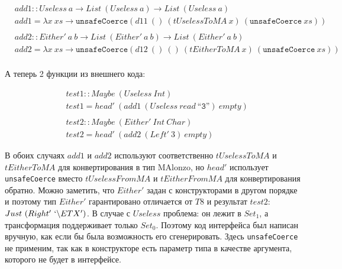\begin{align*}
\\
&add1 :: Useless\ a \rightarrow List\ (Useless\ a) \rightarrow List\ (Useless\ a)\\
&add1 = \lambda x\ xs \rightarrow \texttt{unsafeCoerce} (d11\ () \ (
   tUselessToMA\ x)\ (\texttt{unsafeCoerce}\ xs))\\
\\
&add2 :: Either'\ a\ b \rightarrow List\ (Either'\ a\ b) \rightarrow
   List\ (Either'\ a\ b)\\
&add2 = \lambda x\ xs \rightarrow \texttt{unsafeCoerce} (d12\ ()\ () \ (
   tEitherToMA\ x)\ (\texttt{unsafeCoerce}\ xs))\\
\end{align*}

А теперь 2 функции из внешнего кода:

\begin{align*}
&test1 :: Maybe\ (Useless\ Int)\\
&test1 = head'\ (add1\ (Useless\ read\ \texttt{``3''})\ empty)\\
\\
&test2 :: Maybe\ (Either'\ Int\ Char)\\
&test2 = head'\ (add2\ (Left'\ 3)\ empty)
\end{align*}

В обоих случаях \(add1\) и \(add2\) используют соответственно \(tUselessToMA\) и
\(tEitherToMA\) для конвертирования в тип MAlonzo, но \(head'\) использует
\texttt{unsafeCoerce} вместо \(tUselessFromMA\) и \(tEitherFromMA\) для
конвертирования обратно. Можно заметить, что \(Either'\) задан с конструкторами
в другом порядке и поэтому тип \(Either'\) гарантировано отличается от \(T8\)
и результат \(test2\): \(Just\ (Right'\ `\backslash ETX')\). В случае с
\(Useless\) проблема: он лежит в \(Set_1\), а трансформация поддерживает только
\(Set_0\). Поэтому код интерфейса был написан вручную, как если бы была возможность
его сгенерировать. Здесь \texttt{unsafeCoerce} не применим, так как в конструкторе
есть параметр типа в качестве аргумента, которого не будет в интерфейсе.
